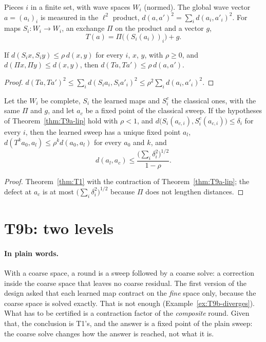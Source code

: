 \begin{definition}\label{def:wave-sweep}
  \leanok
  Pieces $i$ in a finite set, with wave spaces $W_i$ (normed).  The global wave
  vector $a=(a_i)_i$ is measured in the $\ell^2$ product,
  $d(a,a')^2=\sum_id(a_i,a'_i)^2$.  For maps $S_i:W_i\to W_i$, an exchange
  $\Pi$ on the product and a vector $g$,
  \[
    T(a)=\Pi\bigl((S_i(a_i))_i\bigr)+g .
  \]
\end{definition}

\begin{theorem}\label{thm:T9a-lip}
  \leanok
  If $d(S_ix,S_iy)\le\rho\,d(x,y)$ for every $i$, $x$, $y$, with $\rho\ge0$,
  and $d(\Pi x,\Pi y)\le d(x,y)$, then $d(Ta,Ta')\le\rho\,d(a,a')$.
\end{theorem}

\begin{proof}
  \leanok
  $d(Ta,Ta')^2\le\sum_id(S_ia_i,S_ia'_i)^2\le\rho^2\sum_id(a_i,a'_i)^2$.
\end{proof}

\begin{theorem}\label{thm:T9a}
  \leanok
  Let the $W_i$ be complete, $S_i$ the learned maps and $S^c_i$ the classical
  ones, with the same $\Pi$ and $g$, and let $a_c$ be a fixed point of the
  classical sweep.  If the hypotheses of Theorem~\ref{thm:T9a-lip} hold with
  $\rho<1$, and $d\bigl(S_i(a_{c,i}),S^c_i(a_{c,i})\bigr)\le\delta_i$ for every
  $i$, then the learned sweep has a unique fixed point $a_l$,
  $d(T^ka_0,a_l)\le\rho^kd(a_0,a_l)$ for every $a_0$ and $k$, and
  \[
    d(a_l,a_c)\le\frac{\bigl(\sum_i\delta_i^2\bigr)^{1/2}}{1-\rho}.
  \]
\end{theorem}

\begin{proof}
  \leanok
  Theorem~\ref{thm:T1} with the contraction of Theorem~\ref{thm:T9a-lip}; the
  defect at $a_c$ is at most $\bigl(\sum_i\delta_i^2\bigr)^{1/2}$ because
  $\Pi$ does not lengthen distances.
\end{proof}

\section{T9b: two levels}

\paragraph{In plain words.}
With a coarse space, a round is a sweep followed by a coarse solve: a
correction inside the coarse space that leaves no coarse residual.  The first
version of the design asked that each learned map contract on the
\emph{fine} space only, because the coarse space is solved exactly.  That is
not enough (Example~\ref{ex:T9b-diverges}).  What has to be certified is a
contraction factor of the \emph{composite} round.  Given that, the conclusion
is T1's, and the answer is a fixed point of the plain sweep: the coarse solve
changes how the answer is reached, not what it is.

